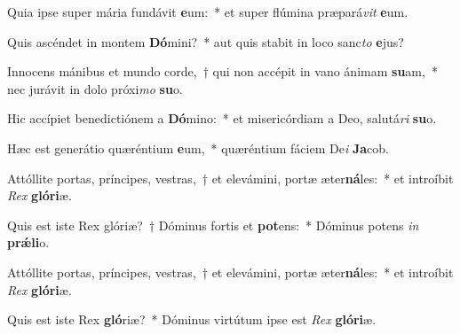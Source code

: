 \item Quia ipse super mária fundávit \textbf{e}um:~* et super flúmina præpará\textit{vit} \textbf{e}um.
\item Quis ascéndet in montem \textbf{Dó}mini?~* aut quis stabit in loco sanc\textit{to} \textbf{e}jus?
\item Innocens mánibus et mundo corde,~† qui non accépit in vano ánimam \textbf{su}am,~* nec jurávit in dolo próxi\textit{mo} \textbf{su}o.
\item Hic accípiet benedictiónem a \textbf{Dó}mino:~* et misericórdiam a Deo, salutá\textit{ri} \textbf{su}o.
\item Hæc est generátio quæréntium \textbf{e}um,~* quæréntium fáciem De\textit{i} \textbf{Ja}cob.
\item Attóllite portas, príncipes, vestras,~† et elevámini, portæ æter\textbf{ná}les:~* et introíbit \textit{Rex} \textbf{gló}\textbf{ri}æ.
\item Quis est iste Rex glóriæ?~† Dóminus fortis et \textbf{pot}ens:~* Dóminus potens \textit{in} \textbf{prǽ}\textbf{li}o.
\item Attóllite portas, príncipes, vestras,~† et elevámini, portæ æter\textbf{ná}les:~* et introíbit \textit{Rex} \textbf{gló}\textbf{ri}æ.
\item Quis est iste Rex \textbf{gló}riæ?~* Dóminus virtútum ipse est \textit{Rex} \textbf{gló}\textbf{ri}æ.
